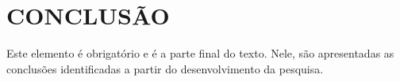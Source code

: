 \documentclass[
        oneside,      %
        english,			
        brazil			 
        ]{abntbibufjf}
\begin{document}



\chapter{CONCLUS\~AO} %

Este elemento \'e obrigat\'orio e \'e a parte final do texto.  Nele, s\~ao apresentadas as conclus\~oes identificadas a partir do desenvolvimento da pesquisa.



\postextual 



\end{document}
